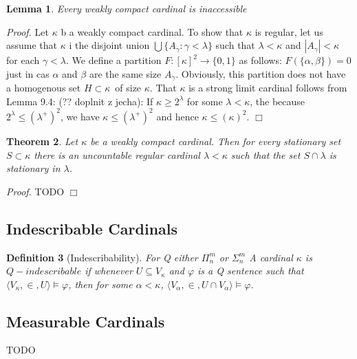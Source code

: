\documentclass[12pt,a4paper]{article}
\newtheorem{theorem}{Theorem}[section]
\newtheorem{definition}[theorem]{Definition}
\newtheorem{lemma}[theorem]{Lemma}
\newenvironment{proof}
{\noindent \textit{Proof.}}
{\hspace*{\fill} $\Box$}
\newcommand{\then}{\rightarrow}
\begin{document}
\begin{lemma}
Every weakly compact cardinal is inaccessible
\end{lemma}

\begin{proof}
Let $\kappa$ b a weakly compact cardinal. To show that $\kappa$ is regular, let us assume that $\kappa$ i the disjoint union
$\bigcup\{A_{\gamma}: \gamma < \lambda\}$ such that $\lambda < \kappa$ and $|A_{\gamma}| < \kappa$ for each $\gamma < \lambda$.
 We define a partition $F: [\kappa]^2 \then \{0, 1\}$ as follows: $F(\{\alpha, \beta\}) = 0$ just in cas $\alpha$ and $\beta$ are the same size $A_{\gamma}$. Obviously, this partition does not have a homogenous set $H \subset \kappa$ of size $\kappa$.
That $\kappa$ is a strong limit cardinal follows from Lemma 9.4: (?? doplnit z jecha): If $\kappa \geq 2^{\lambda}$ for some $\lambda < \kappa$,
the because $2^{\lambda} \leq (\lambda^{+})^2$, we have $\kappa \leq (\lambda^{+})^2$ and hence $\kappa \leq (\kappa)^2$.
\end{proof}

\begin{theorem}\label{th:refl_weakly_compact}
Let $\kappa$ be a weakly compact cardinal. Then for every stationary set $S \subset \kappa$ there is an uncountable regular cardinal $\lambda < \kappa$ such that the set $S \cap \lambda$ is stationary in $\lambda$.
\end{theorem}
\begin{proof}
TODO
\end{proof}

\subsection{Indescribable Cardinals}
\begin{definition}[Indescribability]
For Q either $\Pi^m_n$ or $\Sigma^m_n$\newline
A cardinal $\kappa$ is \emph{$Q-indescribable$} if whenever
$U \subseteq V_\kappa$ and $\varphi$ is a Q sentence such that $\langle V_\kappa, \in, U \rangle \models \varphi$, then for some $\alpha < \kappa$, $\langle V_\alpha, \in, U \cap V_\alpha \rangle \models \varphi$.
\end{definition}

\subsection{Measurable Cardinals}
TODO
\end{document}
